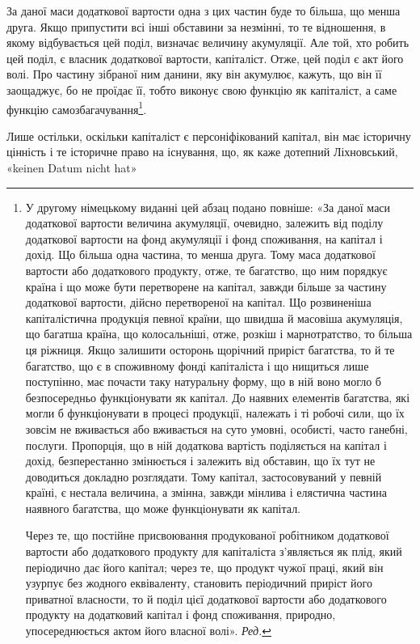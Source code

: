 \disablefootnotebreak{}
За даної маси додаткової вартости одна з цих частин буде то
більша, що менша друга. Якщо припустити всі інші обставини
за незмінні, то те відношення, в якому відбувається цей поділ,
визначає величину акумуляції. Але той, хто робить цей поділ,
є власник додаткової вартости, капіталіст. Отже, цей поділ є
акт його волі. Про частину зібраної ним данини, яку він акумулює,
кажуть, що він її заощаджує, бо не проїдає її, тобто виконує
свою функцію як капіталіст, а саме функцію самозбагачування\footnote*{
У другому німецькому виданні цей абзац подано повніше: «За
даної маси додаткової вартости величина акумуляції, очевидно, залежить
від поділу додаткової вартости на фонд акумуляції і фонд споживання,
на капітал і дохід. Що більша одна частина, то менша друга. Тому маса
додаткової вартости або додаткового продукту, отже, те багатство, що
ним порядкує країна і що може бути перетворене на капітал, завжди
більше за частину додаткової вартости, дійсно перетвореної на капітал.
Що розвиненіша капіталістична продукція певної країни, що швидша
й масовіша акумуляція, що багатша країна, що колосальніші, отже,
розкіш і марнотратство, то більша ця ріжниця. Якщо залишити осторонь
щорічний приріст багатства, то й те багатство, що є в споживному фонді
капіталіста і що нищиться лише поступінно, має почасти таку натуральну
форму, що в ній воно могло б безпосередньо функціонувати як капітал.
До наявних елементів багатства, які могли б функціонувати в процесі
продукції, належать і ті робочі сили, що їх зовсім не вживається або вживається
на суто умовні, особисті, часто ганебні, послуги. Пропорція, що
в ній додаткова вартість поділяється на капітал і дохід, безперестанно
змінюється і залежить від обставин, що їх тут не доводиться докладно
розглядати. Тому капітал, застосовуваний у певній країні, є нестала
величина, а змінна, завжди мінлива і елястична частина наявного багатства,
що може функціонувати як капітал.
\enablefootnotebreak{}

Через те, що постійне присвоювання продукованої робітником додаткової
вартости або додаткового продукту для капіталіста з’являється
як плід, який періодично дає його капітал; через те, що продукт чужої
праці, який він узурпує без жодного еквіваленту, становить періодичний
приріст його приватної власности, то й поділ цієї додаткової вартости або
додаткового продукту на додатковий капітал і фонд споживання, природно,
упосереднюється актом його власної волі». \emph{Ред.}
}.

Лише остільки, оскільки капіталіст є персоніфікований капітал,
він має історичну цінність і те історичне право на існування,
що, як каже дотепний Ліхновський, «keinen Datum nicht hat»
\parbreak{}  %

